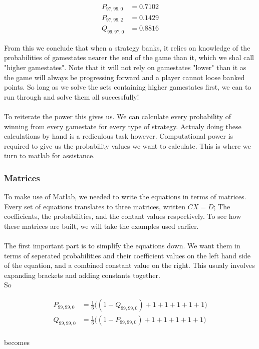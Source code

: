 \documentclass[a4paper,titlepage]{article}
\begin{document}
\begin{align*}
	P_{97,99,0} &= 0.7102\\
	P_{97,99,2} &= 0.1429\\
	Q_{99,97,0} &= 0.8816
\end{align*}

From this we conclude that when a strategy banks, it relies on knowledge of the probabilities of gamestates nearer the end of the game than it, which we shal call "higher gamestates".
Note that it will not rely on gamestates "lower" than it as the game will always be progressing forward and a player cannot loose banked points.
So long as we solve the sets containing higher gamestates first, we can to run through and solve them all successfully!
\\
\\
To reiterate the power this gives us. We can calculate every probability of winning from every gamestate for every type of strategy. Actualy doing these calculations by hand is a rediculous task however.
Computational power is required to give us the probability values we want to calculate. This is where we turn to matlab for assistance.

\subsubsection{Matrices}
To make use of Matlab, we needed to write the equations in terms of matrices.
Every set of equations translates to three matrices, written $CX=D$; The coefficients, the probabilities, and the contant values respectively.
To see how these matrices are built, we will take the examples used earlier.
\\
\\
The first important part is to simplify the equations down. We want them in terms of seperated probabilities and their coefficient values on the left hand side of the equation, and a combined constant value on the right.
This usualy involves expanding brackets and adding constants together.\\
So

\begin{align*}
	P_{99,99,0} &= \frac{1}{6}\bigg((1 - Q_{99,99,0}) + 1 + 1 + 1 + 1 + 1\bigg)\\
	Q_{99,99,0} &= \frac{1}{6}\bigg((1 - P_{99,99,0}) + 1 + 1 + 1 + 1 + 1\bigg)\\
\end{align*}

becomes
\end{document}
